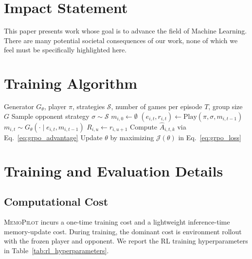 \documentclass{article}
\newcommand{\methodname}{MemoPilot}
\newcommand{\method}{\textsc{\methodname}}
\theoremstyle{plain}
\theoremstyle{definition}
\theoremstyle{remark}
\begin{document}
\section*{Impact Statement}
This paper presents work whose goal is to advance the field of Machine
Learning. There are many potential societal consequences of our work, none of 
which we feel must be specifically highlighted here.




\newpage
\appendix
\onecolumn

\section{Training Algorithm}\label{appendix:training_algorithm}

\begin{algorithm}[h]
\caption{Multi-Turn \method{} Training}
\label{alg:multiturn}
\begin{algorithmic}[1]
\REQUIRE Generator $G_\theta$, player $\pi$, strategies $\mathcal{S}$, number of games per episode $T$, group size $G$
    \STATE Sample opponent strategy $\sigma \sim \mathcal{S}$
        \STATE $m_{i,0} \leftarrow \emptyset$
            \STATE $(e_{i,t}, r_{i,t}) \leftarrow \mathrm{Play}(\pi, \sigma, m_{i,t-1})$
                \STATE $m_{i,t} \sim G_\theta(\cdot \mid e_{i,t}, m_{i,t-1})$
            \ENDIF
        \ENDFOR
            \STATE $R_{i,u} \leftarrow r_{i,u+1}$
        \ENDFOR
    \ENDFOR
    \STATE Compute $\hat{A}_{i,t,k}$ via Eq.~\ref{eq:grpo_advantage}
    \STATE Update $\theta$ by maximizing $\mathcal{J}(\theta)$ in Eq.~\ref{eq:grpo_loss}
\ENDFOR
\end{algorithmic}
\end{algorithm}

\section{Training and Evaluation Details}

\subsection{Computational Cost}\label{appendix:cost}

\method{} incurs a one-time training cost and a lightweight inference-time memory-update cost. During training, the dominant cost is environment rollout with the frozen player and opponent. We report the RL training hyperparameters in Table~\ref{tab:rl_hyperparameters}.
\end{document}
